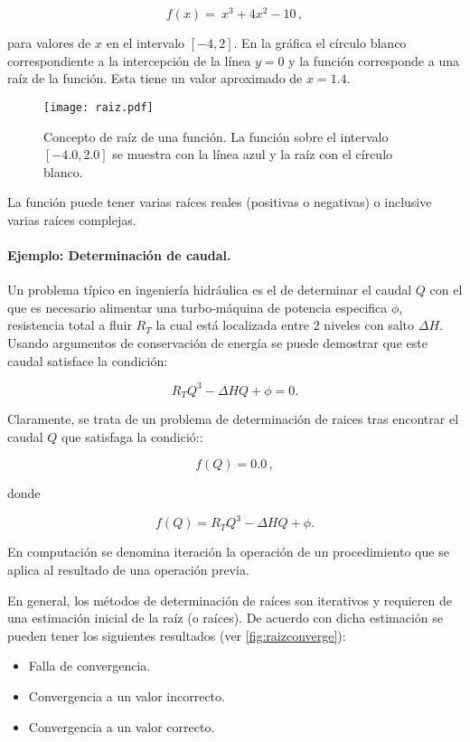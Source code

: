 \[f(x) = \ x^3 + 4x^2 - 10\, ,\]

para valores de $x$ en el intervalo $[-4, 2].$ En la gráfica el círculo blanco correspondiente a la intercepción de la línea $y=0$ y la función corresponde a una raíz de la función. Esta tiene un valor aproximado de $x=1.4.$

\begin{figure}[H]
	\centering
	\texttt{[image: raiz.pdf]}
	\caption{Concepto de raíz de una función. La función sobre el intervalo $[-4.0, 2.0]$ se muestra con la línea azul y la raíz con el círculo blanco.}
	\label{fig:raiz}
\end{figure}


La función puede tener varias raíces reales (positivas o negativas) o inclusive varias raíces complejas.

\paragraph{Ejemplo: Determinación de caudal.}
Un problema típico en ingeniería hidráulica es el de determinar el caudal $Q$ con el que es necesario alimentar una turbo-máquina de potencia especifica $\phi$, resistencia total a fluir $R_T$ la cual está localizada entre 2 niveles con salto $\Delta H$. Usando argumentos de conservación de energía se puede demostrar que este caudal satisface la condición:

\begin{equation}
	{R_T}{Q^3} - \Delta HQ + \phi  = 0.
\label{caudal}
\end{equation}

Claramente, se trata de un problema de determinación de raices tras encontrar el caudal $Q$ que satisfaga la condició::

\[f(Q) = 0.0\, ,\]

donde 

\begin{equation}
f(Q) ={R_T}{Q^3} - \Delta HQ + \phi.
\label{caudalF}
\end{equation}

\begin{tcolorbox}
En computación se denomina iteración la operación de un procedimiento que se aplica al resultado de una operación previa.
\end{tcolorbox}


	En general, los métodos de determinación de raíces son iterativos y requieren de una estimación inicial de la raíz (o raíces). De acuerdo con dicha estimación se pueden tener los siguientes resultados (ver \cref{fig:raizconverge}):
	\begin{itemize}
		\item Falla de convergencia.
		\item Convergencia a un valor incorrecto.
		\item Convergencia a un valor correcto.
	\end{itemize}

